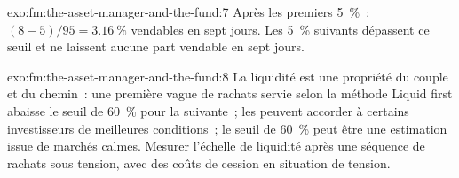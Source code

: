 \begin{solution}{exo:fm:the-asset-manager-and-the-fund:7}
Après les premiers 5~\%~: $(8-5)/95=3.16~\%$ vendables en sept jours. Les 5~\% suivants dépassent ce seuil et ne laissent aucune part vendable en sept jours.
\end{solution}

\begin{solution}{exo:fm:the-asset-manager-and-the-fund:8}
La liquidité est une propriété du couple et du chemin~: une première vague de rachats servie selon la méthode Liquid first abaisse le seuil de 60~\% pour la suivante~; les  peuvent
accorder à certains investisseurs de meilleures conditions~; le seuil de 60~\% peut être une estimation issue de marchés calmes. Mesurer l'échelle de liquidité après une séquence de rachats sous tension, avec
des coûts de cession en situation de tension.
\end{solution}

